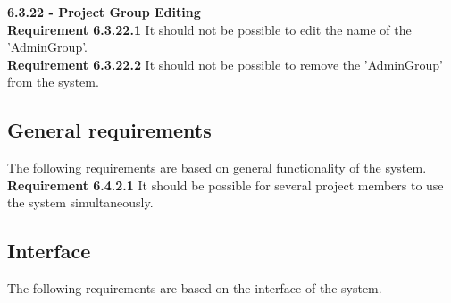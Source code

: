 \documentclass{article}
\begin{document}
{\fontsize{11}{11}\selectfont \noindent\textbf{6.3.22 - Project Group Editing}} \\
\textbf{Requirement 6.3.22.1} It should not be possible to edit the name of the 'AdminGroup'.\\
\textbf{Requirement 6.3.22.2} It should not be possible to remove the 'AdminGroup' from the system. \\

\setcounter{timeScen}{0}
\addtocounter{timeScen}{1}
\setcounter{timeRef}{0}
\addtocounter{timeRef}{1}
%
%
\subsection{General requirements}
The following requirements are based on general functionality of the system.\\ 

\noindent\textbf{Requirement 6.4.2.1}
It should be possible for several project members to use the system simultaneously. \\

\subsection{Interface}
The following requirements are based on the interface of the system.\\
\end{document}
